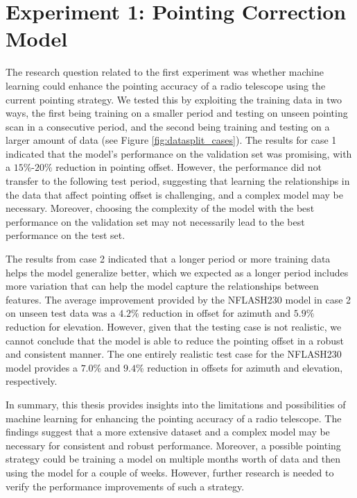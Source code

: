 \section{Experiment 1: Pointing Correction Model}
The research question related to the first experiment was whether machine learning could enhance the pointing accuracy of a radio telescope using the current pointing strategy.
We tested this by exploiting the training data in two ways, the first being training on a smaller period and testing on unseen pointing scan in a consecutive period, and the second being training and testing on a larger amount of data (see Figure \ref{fig:datasplit_cases}).
The results for case 1 indicated that the model's performance on the validation set was promising, with a $15\%$-$20\%$ reduction in pointing offset.
However, the performance did not transfer to the following test period, suggesting that learning the relationships in the data that affect pointing offset is challenging, and a complex model may be necessary.
Moreover, choosing the complexity of the model with the best performance on the validation set may not necessarily lead to the best performance on the test set.

The results from case 2 indicated that a longer period or more training data helps the model generalize better,
which we expected as a longer period includes more variation that can help the model capture the relationships between features.
The average improvement provided by the NFLASH230 model in case 2 on unseen test data was a $4.2\%$ reduction in offset for azimuth and $5.9\%$ reduction for elevation.
However, given that the testing case is not realistic, we cannot conclude that the model is able to reduce the pointing offset in a robust and consistent manner.
The one entirely realistic test case for the NFLASH230 model provides a $7.0\%$ and $9.4\%$ reduction in offsets for azimuth and elevation, respectively. 

In summary, this thesis provides insights into the limitations and possibilities of machine learning for enhancing the pointing accuracy of a radio telescope.
The findings suggest that a more extensive dataset and a complex model may be necessary for consistent and robust performance.
Moreover, a possible pointing strategy could be training a model on multiple months worth of data and then using the model for a couple of weeks.
However, further research is needed to verify the performance improvements of such a strategy.

